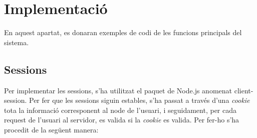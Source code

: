 \documentclass[11pt,catalan,listoffigures,listoftables]{tfgetsinf}
\begin{document}
\section{Implementació}
En aquest apartat, es donaran exemples de codi de les funcions principals del sistema.

\subsection{Sessions}
Per implementar les sessions, s'ha utilitzat el paquet de Node.js anomenat client-session. Per fer que les sessions siguin estables, s'ha passat a través d'una \textit{cookie} tota la informació corresponent al node de l'usuari, i seguidament, per cada request de l'usuari al servidor, es valida si la \textit{cookie} es valida. Per fer-ho s'ha procedit de la següent manera:
\end{document}
